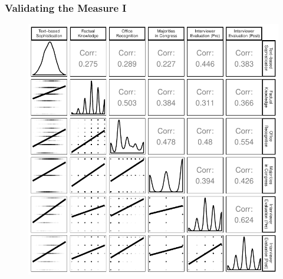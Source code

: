 \documentclass{beamer}
\begin{document}
\begin{frame} %
\frametitle{Validating the Measure I}
  \begin{figure}
  \includegraphics[height = .9\textheight]{../fig/corplot.pdf}
  \end{figure}
\end{frame}
\end{document}
